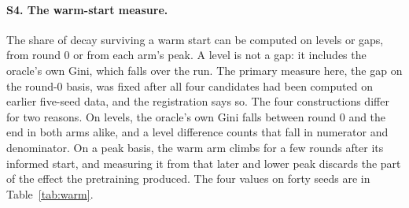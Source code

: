 \paragraph{S4. The warm-start measure.} The share of decay surviving a warm start
can be computed on levels or gaps, from round 0 or from each arm's peak. A
level is not a gap: it includes the oracle's own Gini, which falls over the run.
The primary measure here, the gap on the round-0 basis, was fixed after all four
candidates had been computed on earlier five-seed data, and the registration says
so. The four constructions
differ for two reasons. On levels, the oracle's own Gini falls between round 0 and
the end in both arms alike, and a level difference counts that fall in numerator
and denominator. On a peak basis, the warm arm climbs for a few rounds after its
informed start, and measuring it from that later and lower peak discards the part
of the effect the pretraining produced. The four values on forty seeds are in
Table~\ref{tab:warm}.
